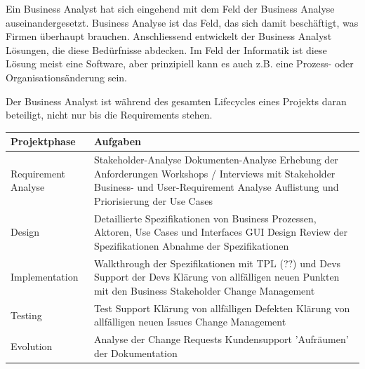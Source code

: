 \documentclass[a4paper, 11pt]{article}
\renewcommand*{\thead}[1]{\bfseries #1}
\newcommand \tabitem{\makebox[1em][r]{\textbullet~}}
\begin{document}
Ein Business Analyst hat sich eingehend mit dem Feld der Business Analyse auseinandergesetzt. Business Analyse ist das Feld, das sich damit beschäftigt, was Firmen überhaupt brauchen. Anschliessend entwickelt der Business Analyst Lösungen, die diese Bedürfnisse abdecken. Im Feld der Informatik ist diese Lösung meist eine Software, aber prinzipiell kann es auch z.B. eine Prozess- oder Organisationsänderung sein.

\vspace{10px}

Der Business Analyst ist während des gesamten Lifecycles eines Projekts daran beteiligt, nicht nur bis die Requirements stehen. 

\vspace{60px}

\begin{tabularx}{\textwidth}{|p{5cm}|X|}
	\hline 
    \thead{Projektphase} & \thead{Aufgaben} \\
    \hline
    Requirement Analyse & 
        \tabitem Stakeholder-Analyse \newline
        \tabitem Dokumenten-Analyse \newline
        \tabitem Erhebung der Anforderungen \newline
        \tabitem Workshops / Interviews mit Stakeholder \newline
        \tabitem Business- und User-Requirement Analyse \newline
        \tabitem Auflistung und Priorisierung der Use Cases 
        \\
    \hline
    Design & 
        \tabitem Detaillierte Spezifikationen von Business Prozessen, Aktoren, Use Cases und Interfaces \newline
        \tabitem GUI Design \newline
        \tabitem Review der Spezifikationen \newline
        \tabitem Abnahme der Spezifikationen
    \\
    \hline
    Implementation & 
        \tabitem Walkthrough der Spezifikationen mit TPL (??) und Devs \newline
        \tabitem Support der Devs \newline
        \tabitem Klärung von allfälligen neuen Punkten mit den Business Stakeholder \newline
        \tabitem Change Management
    \\
    \hline
    Testing & 
        \tabitem Test Support \newline
        \tabitem Klärung von allfälligen Defekten \newline
        \tabitem Klärung von allfälligen neuen Issues \newline
        \tabitem Change Management
    \\
    \hline
    Evolution & 
        \tabitem Analyse der Change Requests \newline
        \tabitem Kundensupport \newline
        \tabitem 'Aufräumen' der Dokumentation
    \\
    \hline
\end{tabularx}
\end{document}
